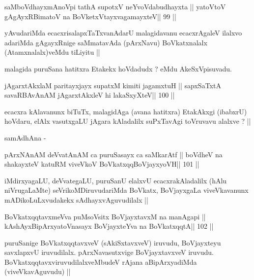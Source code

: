 \begin{shl}
saMboVdhayxmAnoV\s pi tathA supotxV neYvoVdabudhayxta ||
yatoV\s toV gAgAyxRBimatoV na BoVketxVtayxvagamayxteV\hfill || 99 ||
\end{shl}

\begin{artha}
yAvudariMda ecacxrisalapxTaTxvanAdarU malagidavanu ecacxrAgaleV ilalxvo 
adariMda gAgayxRnige saMmatavAda (pArxNavu) BoVkatxnalalx (Atamxnalalx)veMdu tiLiyitu ||
\end{artha} 

\begin{artha}
malagida puruSana hatitxra Etakekx hoVdadudx ? eMdu AkeSxVpisuvadu.
\end{artha}

\begin{shl}
jAgarxtAkxlaM paritayxjayx supatxM kimiti jagamxtuH ||
sapxSaTxtA savaRBAvAnAM jAgarxtAkxleV hi lakaSxyXteV\hfill || 100 ||
\end{shl}

\begin{artha}
ecacxra kAlavanunx biTuTx, malagidAga (avana hatitxra) EtakAkxgi (ibabxrU) hoVdaru, elAlx vasutxgaLU jAgara kAladalilx suPxTavAgi toVruvavu  alalxve ? ||
\end{artha}

\begin{artha}
samAdhAna -
\end{artha} 

\begin{shl}
pArxNAnAM deVvatAnAM ca puruSasayx ca saMkarAtf ||
boVdheV na shakayxteV katuRM viveVkoV BoVkatxqqBoVjayxyoVH\hfill || 101 ||
\end{shl}

\begin{artha}
iMdirxyagaLU, deVvategaLU, puruSanU elalxvU ecacxrakAladalilx (hAlu niVrugaLaMte) seVrikoMDiruvudariMda BoVkatx, BoVjayxgaLa viveVkavanunx mADikoLuLxvudakekx sAdhayxvAguvudilalx ||
\end{artha} 

\begin{shl}
BoVkatxqqtavxmeVva puMsoV\s sitx BoVjayxtavxM na manAgapi ||
kAshAyxBipArxyatoV\s nasayx BoVjayxteYva na BoVkatxqqtA\hfill || 102 ||
\end{shl}

\begin{artha}
puruSanige BoVkatxqqtavxveV (sAkiSxtavxveV) iruvudu, BoVjayxteyu savxlapxvU iruvudilalx. pArxNavasutxvige BoVjayxtavxveV iruvudu. BoVkatxqqtavxviruvudilalxveMbudeV rAjana aBipArxyadiMda (viveVkavAguvudu) ||
\end{artha}

